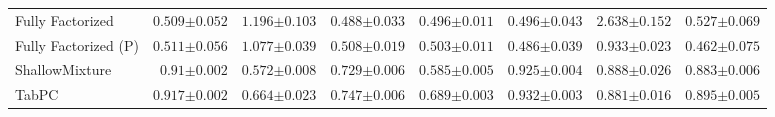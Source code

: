\begin{tabular}{lrrrrrrr}
    Fully Factorized & $0.509${\tiny${\pm 0.052}$} & $1.196${\tiny${\pm 0.103}$} & $0.488${\tiny${\pm 0.033}$} & $0.496${\tiny${\pm 0.011}$} & $0.496${\tiny${\pm 0.043}$} & $2.638${\tiny${\pm 0.152}$} & $0.527${\tiny${\pm 0.069}$} \\
    Fully Factorized (P) & $0.511${\tiny${\pm 0.056}$} & $1.077${\tiny${\pm 0.039}$} & $0.508${\tiny${\pm 0.019}$} & $0.503${\tiny${\pm 0.011}$} & $0.486${\tiny${\pm 0.039}$} & $0.933${\tiny${\pm 0.023}$} & $0.462${\tiny${\pm 0.075}$} \\
    ShallowMixture & $0.91${\tiny${\pm 0.002}$} & $0.572${\tiny${\pm 0.008}$} & $0.729${\tiny${\pm 0.006}$} & $0.585${\tiny${\pm 0.005}$} & $0.925${\tiny${\pm 0.004}$} & $0.888${\tiny${\pm 0.026}$} & $0.883${\tiny${\pm 0.006}$} \\
    TabPC & $0.917${\tiny${\pm 0.002}$} & $0.664${\tiny${\pm 0.023}$} & $0.747${\tiny${\pm 0.006}$} & $0.689${\tiny${\pm 0.003}$} & $0.932${\tiny${\pm 0.003}$} & $0.881${\tiny${\pm 0.016}$} & $0.895${\tiny${\pm 0.005}$} \\
    \bottomrule[1.0pt]
\end{tabular}